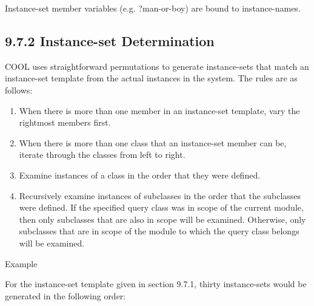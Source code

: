 \documentclass[letterpaper,10pt,english]{sphinxmanual}
\begin{document}
Instance-set member variables (e.g. ?man-or-boy) are bound to
instance-names.


\subsection{9.7.2 Instance-set Determination}
\label{\detokenize{cool:instance-set-determination}}
COOL uses straightforward permutations to generate instance-sets that
match an instance-set template from the actual instances in the system.
The rules are as follows:
\begin{enumerate}
\def\theenumi{\arabic{enumi}}
\def\labelenumi{\theenumi .}
\makeatletter\def\p@enumii{\p@enumi \theenumi .}\makeatother
\item {} 
When there is more than one member in an instance-set template, vary
the rightmost members first.

\item {} 
When there is more than one class that an instance-set member can be,
iterate through the classes from left to right.

\item {} 
Examine instances of a class in the order that they were defined.

\item {} 
Recursively examine instances of subclasses in the order that the
subclasses were defined. If the specified query class was in scope of
the current module, then only subclasses that are also in scope will be
examined. Otherwise, only subclasses that are in scope of the module to
which the query class belongs will be examined.

\end{enumerate}

Example

For the instance-set template given in section 9.7.1, thirty
instance-sets would be generated in the following order:
\end{document}
